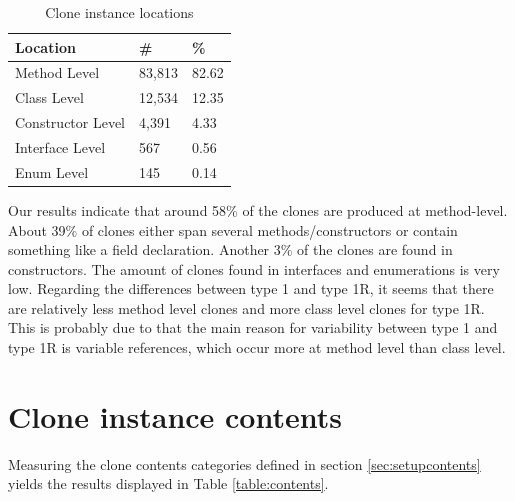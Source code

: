 \begin{table}[H]
  \begin{center}
  \caption{Clone instance locations} \label{table:locations}
  \medskip
\begin{tabular}{|l|l|l|}
\hline
\textbf{Location}   & \textbf{\#} & \textbf{\%} \\ \hline
Method Level        & 83,813 & 82.62            \\ \hline
Class Level        & 12,534 & 12.35            \\ \hline
Constructor Level    & 4,391 & 4.33           \\ \hline
Interface Level   & 567 & 0.56           \\ \hline
Enum Level         & 145 & 0.14            \\ \hline
\end{tabular}
\end{center}
\end{table}

Our results indicate that around 58\% of the clones are produced at method-level. About 39\% of clones either span several methods/constructors or contain something like a field declaration. Another 3\% of the clones are found in constructors. The amount of clones found in interfaces and enumerations is very low. Regarding the differences between type 1 and type 1R, it seems that there are relatively less method level clones and more class level clones for type 1R. This is probably due to that the main reason for variability between type 1 and type 1R is variable references, which occur more at method level than class level.

\section{Clone instance contents}\label{chap:clonecontents}
Measuring the clone contents categories defined in section \ref{sec:setupcontents} yields the results displayed in Table \ref{table:contents}.

